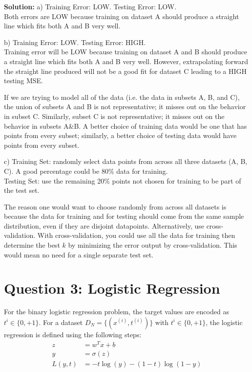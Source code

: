 \documentclass[12pt]{article}
\begin{document}
	\begin{framed}
		\textbf{Solution: }
		a) Training Error: LOW. Testing Error: LOW.\\
		Both errors are LOW because training on dataset A should produce a straight line which fits both A and B very well. 
		
		b) Training Error: LOW. Testing Error: HIGH. \\
		Training error will be LOW because training on dataset A and B should produce a straight line which fits both A and B very well. However, extrapolating forward the straight line produced will not be a good fit for dataset C leading to a HIGH testing MSE.
		
	 	If we are trying to model all of the data (i.e. the data in subsets A, B, and C), the union of subsets A and B is not representative; it misses out on the behavior in subset C. Similarly, subset C is not representative; it misses out on the behavior in subsets A\&B. A better choice of training data would be one that has points from every subset; similarly, a better choice of testing data would have points from every subset.
		
		c) Training Set: randomly select data points from across all three datasets (A, B, C). A good percentage could be 80\% data for training.\\
		Testing Set: use the remaining 20\% points not chosen for training to be part of the test set.
		
		The reason one would want to choose randomly from across all datasets is because the data for training and for testing should come from the same sample distribution, even if they are disjoint datapoints. Alternatively, use cross-validation. With cross-validation, you could use all the data for training then determine the best $k$ by minimizing the error output by cross-validation. This would mean no need for a single separate test set.
	\end{framed}

	\section*{Question 3: Logistic Regression \cite{q3}}
	For the binary logistic regression problem, the target values are encoded as $t^i \in \{0,+1\}$.
	For a dataset $D_N = \{(x^{(i)}, t^{(i)})\}$ with $t^i \in \{0,+1\}$, the logistic regression is defined using the following steps:
	\begin{align}
		z &= w^Tx + b \\
		y &= \sigma(z) \\
		L(y,t) &= -t\log(y) - (1-t) \log (1-y)
	\end{align}
	
\end{document}
